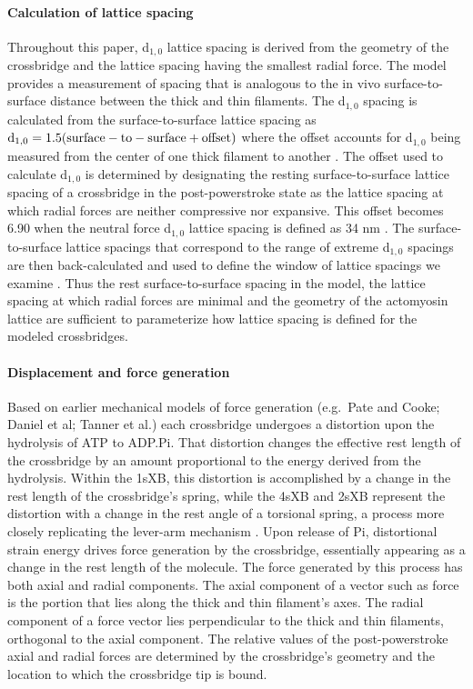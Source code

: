 \documentclass[]{article}
\begin{document}
\paragraph{Calculation of lattice spacing} %
Throughout this paper, d$_{1,0}$ lattice spacing is derived from the geometry of the crossbridge and the lattice spacing having the smallest radial force. 
The model provides a measurement of spacing that is analogous to the in vivo surface-to-surface distance between the thick and thin filaments.
The d$_{1,0}$ spacing is calculated from the surface-to-surface lattice spacing as $\rm{d}_{1,0} = 1.5 (surface-to-surface + offset)$ where the offset accounts for d$_{1,0}$ being measured from the center of one thick filament to another \citep{Millman1998}.
The offset used to calculate d$_{1,0}$ is determined by designating the resting surface-to-surface lattice spacing of a crossbridge in the post-powerstroke state as the lattice spacing at which radial forces are neither compressive nor expansive.  
This offset becomes 6.90 when the neutral force d$_{1,0}$ lattice spacing is defined as 34 nm \citep{Brenner1991}. 
The surface-to-surface lattice spacings that correspond to the range of extreme d$_{1,0}$ spacings are then back-calculated and used to define the window of lattice spacings we examine \citep{Millman1998}. %
Thus the rest surface-to-surface spacing in the model, the lattice spacing at which radial forces are minimal and the geometry of the actomyosin lattice are sufficient to parameterize how lattice spacing is defined for the modeled crossbridges. 

\paragraph{Displacement and force generation} %
Based on earlier mechanical models of force generation (e.g.\ Pate and Cooke; Daniel et al; Tanner et al.) each crossbridge undergoes a distortion upon the hydrolysis of ATP to ADP.Pi.  
That distortion changes the effective rest length of the crossbridge by an amount proportional to the energy derived from the hydrolysis.  
Within the 1sXB, this distortion is accomplished by a change in the rest length of the crossbridge's spring, while the 4sXB and 2sXB represent the distortion with a change in the rest angle of a torsional spring, a process more closely replicating the lever-arm mechanism \citep{Reedy2000}.
Upon release of Pi, distortional strain energy drives force generation by the crossbridge, essentially appearing as a change in the rest length of the molecule. 
The force generated by this process has both axial and radial components. 
The axial component of a vector such as force is the portion that lies along the thick and thin filament's axes. 
The radial component of a force vector lies perpendicular to the thick and thin filaments, orthogonal to the axial component. 
The relative values of the post-powerstroke axial and radial forces are determined by the crossbridge's geometry and the location to which the crossbridge tip is bound. 
\end{document}

